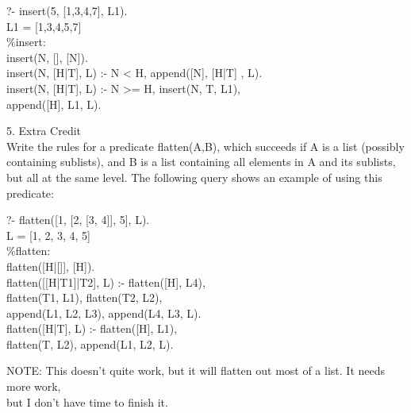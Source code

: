 \documentclass[12pt]{article}
\begin{document}
\begin{flushleft}
{\selectfont
\qquad ?- insert(5, [1,3,4,7], L1).\\
\qquad L1 = [1,3,4,5,7]\\
[6mm]

\qquad \qquad \%insert:\\
\qquad \qquad insert(N, [], [N]).\\
\qquad \qquad insert(N, [H|T], L) :- N < H,  append([N], [H|T] , L).\\
\qquad \qquad insert(N, [H|T], L) :- N >= H, insert(N, T, L1),\\
\qquad \qquad \qquad \qquad \qquad \qquad \qquad \qquad \qquad \qquad \qquad \qquad append([H], L1, L).\\
[6mm]
}


5. Extra Credit\\
Write the rules for a predicate {\selectfont flatten(A,B)}, which succeeds if {\selectfont A} is a
list (possibly containing sublists), and {\selectfont B} is a list containing all elements in {\selectfont A} and its sublists, but all at the same level. The following query shows an example of using this predicate:\\
[2mm]

{\selectfont
	
\qquad ?- flatten([1, [2, [3, 4]], 5], L).\\
\qquad L = [1, 2, 3, 4, 5]\\
[6mm]

\qquad \qquad \%flatten:\\
\qquad \qquad flatten([H|[]], [H]).\\
\qquad \qquad flatten([[H|T1]|T2], L) :- flatten([H], L4),\\
\qquad \qquad \qquad \qquad \qquad \qquad flatten(T1, L1), flatten(T2, L2),\\
\qquad \qquad \qquad \qquad \qquad \qquad \qquad append(L1, L2, L3), append(L4, L3, L).\\
\qquad \qquad flatten([H|T], L) :- flatten([H], L1),\\
\qquad \qquad \qquad \qquad \qquad \qquad \qquad \qquad flatten(T, L2), append(L1, L2, L).\\
[6mm]

}

\qquad \qquad NOTE: This doesn't quite work, but it will flatten out most of a list.  It needs more work,\\
\qquad \qquad but I don't have time to finish it.\\

\end{flushleft}
\end{document}
